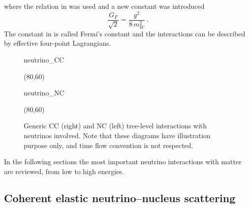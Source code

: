 where the relation in  was used and a new constant was introduced 
\begin{equation}
	\label{eq:fermi_const}
	\frac{G_F}{\sqrt{2}} = \frac{g^2}{8\,m_W^2}\ .
\end{equation}
The constant in  is called Fermi's constant and the interactions %
can be described by effective four-point Lagrangians.
						    
\begin{figure}
	\centering
	\medskip
	\begin{fmffile}{neutrino_CC}
		\begin{fmfgraph*}(80,60)
		\end{fmfgraph*}
	\end{fmffile}
	\qquad
	\raisebox{2.5em}{,}
	\qquad
	\begin{fmffile}{neutrino_NC}
		\begin{fmfgraph*}(80,60)
		\end{fmfgraph*}
	\end{fmffile}
	\bigskip
	\caption{Generic CC (right) and NC (left) tree-level interactions with neutrinos involved.
		Note that these diagrams have illustration purpose only, and time flow convention is not respected. }
	\label{fig:neutrino_tree}
\end{figure}

In the following sections the most important neutrino interactions with matter are reviewed, %
from low to high energies.

\subsection{Coherent elastic neutrino--nucleus scattering}
\label{sec:cevns}

